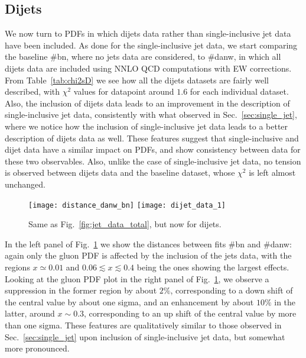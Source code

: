 \subsection{Dijets}
We now turn to PDFs in which dijets data rather than single-inclusive jet data have been included.
As done for the single-inclusive jet data, we start comparing the baseline \#bn, where no jets data are considered,
to \#danw, in which all dijets data are included using NNLO QCD computations with EW corrections.
From Table~\ref{tab:chi2sD} we see how all the dijets datasets are fairly well described, with $\chi^2$ values for datapoint
around $1.6$ for each individual dataset. Also, the inclusion of dijets data leads to an improvement in the description
of single-inclusive jet data, consistently with what observed in Sec.~\ref{sec:single_jet}, where 
we notice how the inclusion of single-inclusive jet data leads to a better description of dijets data as well.
These features suggest that single-inclusive and dijet data have a similar impact on PDFs, and show consistency
between data for these two observables. 
%
Also, unlike the case of single-inclusive jet data, no tension is observed between dijets data and the baseline dataset,
whose $\chi^2$ is left almost unchanged.
\begin{figure}[!t]
    \centering
    \texttt{[image: distance\_danw\_bn]}
    \texttt{[image: dijet\_data\_1]}\\
    \caption{Same as Fig.~\ref{fig:jet_data_total}, but now for dijets.}
    \label{fig:dijet_data_total}
\end{figure}

%
In the left panel of Fig.~\ref{fig:dijet_data_total} we show the distances between fits \#bn and \#danw: again only
the gluon PDF is affected by the inclusion of the jets data, with the regions $x\simeq 0.01$ and $0.06\lesssim x \lesssim 0.4$
being the ones showing the largest effects.
Looking at the gluon PDF plot in the right panel of Fig.~\ref{fig:dijet_data_total}, we observe a suppression in the former region
by about $2\%$, corresponding to a down shift of the central value by about one sigma, and an enhancement by about $10\%$
in the latter, around $x\sim 0.3$, corresponding to an up shift of the central value by more than one sigma.
%
These features are qualitatively similar to those observed in Sec.~\ref{sec:single_jet} upon inclusion of single-inclusive jet
data, but somewhat more pronounced.    

